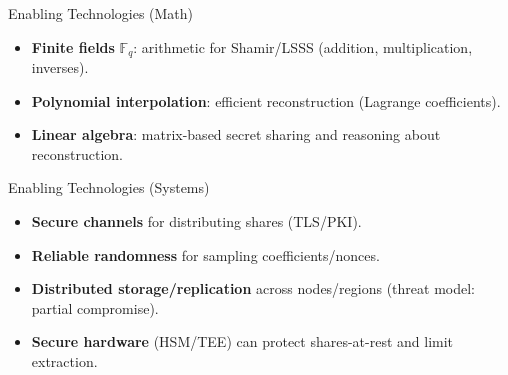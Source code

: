 \begin{frame}{Enabling Technologies (Math)}
	\begin{itemize}
		\item \textbf{Finite fields} \(\mathbb{F}_q\): arithmetic for Shamir/LSSS (addition, multiplication, inverses).
		\item \textbf{Polynomial interpolation}: efficient reconstruction (Lagrange coefficients).
		\item \textbf{Linear algebra}: matrix-based secret sharing and reasoning about reconstruction.
	\end{itemize}
\end{frame}

\begin{frame}{Enabling Technologies (Systems)}
	\begin{itemize}
		\item \textbf{Secure channels} for distributing shares (TLS/PKI).
		\item \textbf{Reliable randomness} for sampling coefficients/nonces.
		\item \textbf{Distributed storage/replication} across nodes/regions (threat model: partial compromise).
		\item \textbf{Secure hardware} (HSM/TEE) can protect shares-at-rest and limit extraction.
	\end{itemize}
\end{frame}
